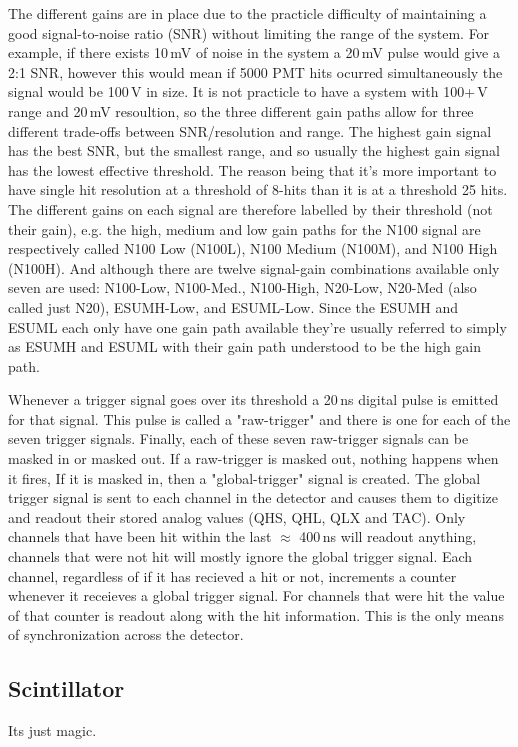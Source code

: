 The different gains are in place due to the practicle difficulty of maintaining
a good signal-to-noise ratio (SNR) without limiting the range of the
system.
For example, if there exists 10\,mV of noise in the system a 20\,mV pulse
would give a 2:1 SNR, however this would mean if 5000 PMT hits ocurred simultaneously
the signal would be 100\,V in size.
It is not practicle to have a system with 100+\,V range and 20\,mV resoultion,
so the three different gain paths allow for three different trade-offs between
SNR/resolution and range.
The highest gain signal has the best SNR, but the smallest range, and so usually
the highest gain signal has the lowest effective threshold.
The reason being that it's more important to have single hit resolution at a threshold
of 8-hits than it is at a threshold 25 hits.
The different gains on each signal are therefore labelled by their threshold (not their gain), e.g.
the high, medium and low gain paths for the N100 signal are respectively called
N100 Low (N100L), N100 Medium (N100M), and N100 High (N100H).
And although there are twelve signal-gain combinations available only seven are
used: N100-Low, N100-Med., N100-High, N20-Low, N20-Med (also called just N20), ESUMH-Low, and ESUML-Low.
Since the ESUMH and ESUML each only have one gain path available they're usually
referred to simply as ESUMH and ESUML with their gain path understood to be
the high gain path.

Whenever a trigger signal goes over its threshold a 20\,ns digital pulse is
emitted for that signal. This pulse is called a "raw-trigger" and there is
one for each of the seven trigger signals.
Finally, each of these seven raw-trigger signals can be masked in or masked out.
If a raw-trigger is masked out, nothing happens when it fires,
If it is masked in, then a "global-trigger" signal is created.
The global trigger signal is sent to each channel in the detector and
causes them to digitize and readout their stored analog values (QHS, QHL, QLX and TAC).
Only channels that have been hit within the last $\approx$ 400\,ns will readout
anything, channels that were not hit will mostly ignore the global trigger signal.
Each channel, regardless of if it has recieved a hit or not, increments
a counter whenever it receieves a global trigger signal.
For channels that were hit the value of that counter is readout
along with the hit information.
This is the only means of synchronization across the detector.








\subsection{Scintillator}
Its just magic.

